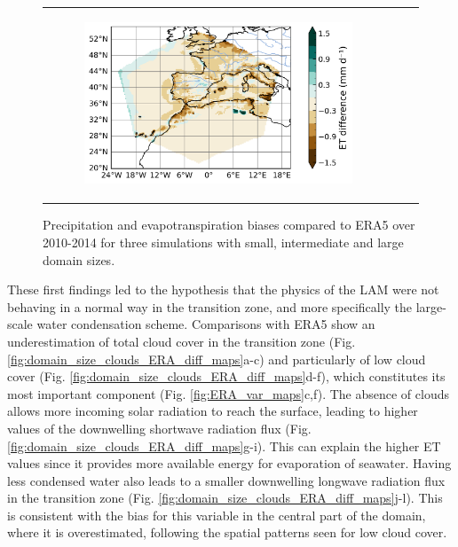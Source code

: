 \begin{figure}[htbp]
\begin{tabular}{ccc}
\begin{subfigure}[b]{0.33\textwidth}
            \includegraphics[width=\textwidth]{images/chap4/domain_size/diff_map_evap_era_LAM_2000km_NBP80.png}
        \end{subfigure} 
    \end{tabular}
    \caption{Precipitation and evapotranspiration biases compared to ERA5 over 2010-2014 for three simulations with small, intermediate and large domain sizes.}
    \label{fig:domain_size_P_ET_ERA_diff_maps}
\end{figure}

These first findings led to the hypothesis that the physics of the LAM were not behaving in a normal way in the transition zone, and more specifically the large-scale water condensation scheme. 
Comparisons with ERA5 show an underestimation of total cloud cover in the transition zone (Fig. \ref{fig:domain_size_clouds_ERA_diff_maps}a-c) and particularly of low cloud cover (Fig. \ref{fig:domain_size_clouds_ERA_diff_maps}d-f), which constitutes its most important component (Fig. \ref{fig:ERA_var_maps}c,f).
The absence of clouds allows more incoming solar radiation to reach the surface, leading to higher values of the downwelling shortwave radiation flux (Fig. \ref{fig:domain_size_clouds_ERA_diff_maps}g-i). This can explain the higher ET values since it provides more available energy for evaporation of seawater.
Having less condensed water also leads to a smaller downwelling longwave radiation flux in the transition zone (Fig. \ref{fig:domain_size_clouds_ERA_diff_maps}j-l). This is consistent with the bias for this variable in the central part of the domain, where it is overestimated, following the spatial patterns seen for low cloud cover.


